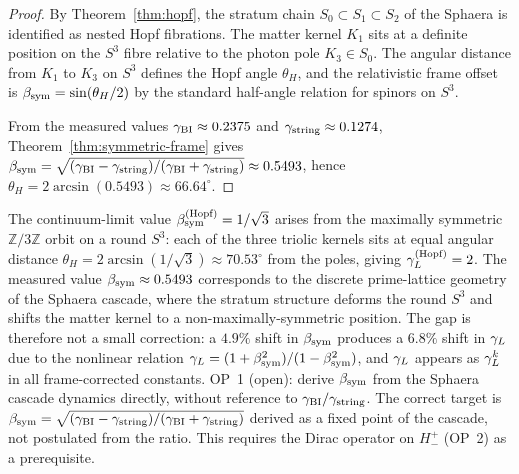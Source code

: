 \begin{proof}
By Theorem~\ref{thm:hopf}, the stratum chain
$S_0\subset S_1\subset S_2$ of the Sphaera is identified as nested Hopf
fibrations. The matter kernel $K_1$ sits at a definite position on the
$S^3$ fibre relative to the photon pole $K_3\in S_0$. The angular
distance from $K_1$ to $K_3$ on $S^3$ defines the Hopf angle $\theta_H$,
and the relativistic frame offset is $\beta_{\mathrm{sym}}=\sin(\theta_H/2)$ by the
standard half-angle relation for spinors on $S^3$.

From the measured values $\gamma_{\mathrm{BI}}\approx 0.2375$ and
$\gamma_{\mathrm{string}}\approx 0.1274$, Theorem~\ref{thm:symmetric-frame} gives
$\beta_{\mathrm{sym}}=\sqrt{(\gamma_{\mathrm{BI}}-\gamma_{\mathrm{string}})/(\gamma_{\mathrm{BI}}+\gamma_{\mathrm{string}})}\approx 0.5493$, hence
$\theta_H=2\arcsin(0.5493)\approx 66.64^\circ$.
\end{proof}

\begin{remark}
\label{rem:bsym-hopf-gap}
The continuum-limit value $\beta_{\mathrm{sym}}^{(\rm Hopf)}=1/\sqrt{3}$ arises from
the maximally symmetric $\mathbb{Z}/3\mathbb{Z}$ orbit on a round $S^3$:
each of the three triolic kernels sits at equal angular distance
$\theta_H=2\arcsin(1/\sqrt{3})\approx 70.53^\circ$ from the poles,
giving $\gamma_L^{(\rm Hopf)}=2$.
The measured value $\beta_{\mathrm{sym}}\approx 0.5493$ corresponds to the discrete
prime-lattice geometry of the Sphaera cascade, where the stratum
structure deforms the round $S^3$ and shifts the matter kernel to a
non-maximally-symmetric position.
The gap is therefore not a small correction: a $4.9\%$ shift in $\beta_{\mathrm{sym}}$
produces a $6.8\%$ shift in $\gamma_L$ due to the nonlinear relation
$\gamma_L=(1+\beta_{\mathrm{sym}}^2)/(1-\beta_{\mathrm{sym}}^2)$, and $\gamma_L$ appears as $\gamma_L^k$ in all
frame-corrected constants.
OP~1 (open): derive $\beta_{\mathrm{sym}}$ from the Sphaera cascade dynamics directly,
without reference to $\gamma_{\mathrm{BI}}/\gamma_{\mathrm{string}}$. The correct target is
$\beta_{\mathrm{sym}}=\sqrt{(\gamma_{\mathrm{BI}}-\gamma_{\mathrm{string}})/(\gamma_{\mathrm{BI}}+\gamma_{\mathrm{string}})}$ derived as a fixed point
of the cascade, not postulated from the ratio. This requires the
Dirac operator on $H^+_-$ (OP~2) as a prerequisite.
\end{remark}

